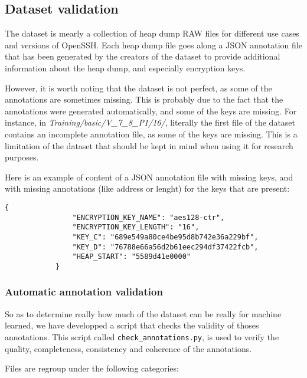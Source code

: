     \subsection{Dataset validation}
    The dataset is mearly a collection of heap dump RAW files for different use cases and versions of OpenSSH. Each heap dump file goes along a JSON annotation file that has been generated by the creators of the dataset to provide additional information about the heap dump, and especially encryption keys.
    
    However, it is worth noting that the dataset is not perfect, as some of the annotations are sometimes missing. This is probably due to the fact that the annotations were generated automatically, and some of the keys are missing. For instance, in \textit{Training/basic/V\_7\_8\_P1/16/}, literally the first file of the dataset contains an incomplete annotation file, as some of the keys are missing. This is a limitation of the dataset that should be kept in mind when using it for research purposes.

    \begin{minipage}{\dimexpr\linewidth-20pt}
        Here is an example of content of a JSON annotation file with missing keys, and with missing annotations (like address or lenght) for the keys that are present:

        \begin{lstlisting}[style=json, caption={Missing keys in JSON annotation file \textit{Training/basic/V\_6\_0\_P1/16/24375-1644243522.json}}]
            {
                "ENCRYPTION_KEY_NAME": "aes128-ctr",
                "ENCRYPTION_KEY_LENGTH": "16",
                "KEY_C": "689e549a80ce4be95d8b742e36a229bf",
                "KEY_D": "76788e66a56d2b61eec294df37422fcb",
                "HEAP_START": "5589d41e0000"
            }
        \end{lstlisting}
    \end{minipage}

    \subsubsection{Automatic annotation validation}
    So as to determine really how much of the dataset can be really for machine learned, we have developped a script that checks the validity of thoses annotations. This script called \texttt{check\_annotations.py}, is used to verify the quality, completeness, consistency and coherence of the annotations.

    Files are regroup under the following categories:

